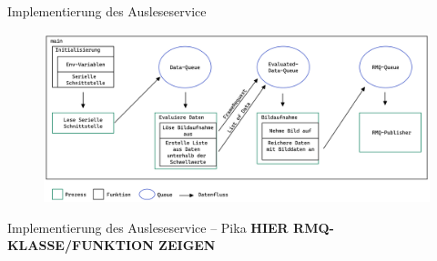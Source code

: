 \documentclass[10pt,ngerman]{beamer}
\begin{document}




\begin{frame}[fragile]{Implementierung des Ausleseservice}
  \begin{figure}[htpb]
    \centering
    \includegraphics[width=1\textwidth]{pics/DataReaderDataFlow.png}
  \end{figure}
\end{frame}


\begin{frame}[fragile]{Implementierung des Ausleseservice -- Pika}
  \textbf{HIER RMQ-KLASSE/FUNKTION ZEIGEN}
\end{frame}
\end{document}
